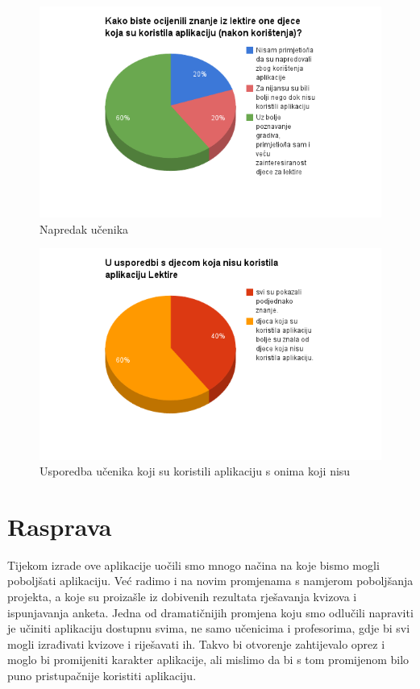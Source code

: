 \documentclass{scrreprt}
\begin{document}
\begin{figure}[H]
  \includegraphics[width=\textwidth, clip=true, trim=0 2.5cm 0 0]{advance}
  \caption{Napredak učenika}
\end{figure}

\begin{figure}[H]
  \includegraphics[width=\textwidth, clip=true, trim=0 2.5cm 0 0]{comparison}
  \caption{Usporedba učenika koji su koristili aplikaciju s onima koji nisu}
\end{figure}

\chapter{Rasprava}


Tijekom izrade ove aplikacije uočili smo mnogo načina na koje bismo mogli
poboljšati aplikaciju. Već radimo i na novim promjenama s namjerom poboljšanja
projekta, a koje su proizašle iz dobivenih rezultata rješavanja kvizova i
ispunjavanja anketa. Jedna od dramatičnijih promjena koju smo odlučili napraviti
je učiniti aplikaciju dostupnu svima, ne samo učenicima i profesorima, gdje bi
svi mogli izrađivati kvizove i riješavati ih. Takvo bi otvorenje zahtijevalo
oprez i moglo bi promijeniti karakter aplikacije, ali mislimo da bi s tom
promijenom bilo puno pristupačnije koristiti aplikaciju.
\end{document}
